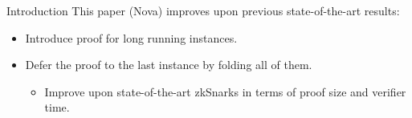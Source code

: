 \begin{frame}{Introduction}
	This paper \cite{KothapalliST22} (Nova) improves upon previous state-of-the-art results:
	\begin{itemize}
		\item Introduce proof for long running instances. 
		\item Defer the proof to the last instance by folding all of them.
		\begin{itemize}
			\item Improve upon state-of-the-art zkSnarks in terms of proof size and verifier time.
		\end{itemize}
	\end{itemize}
\end{frame}
